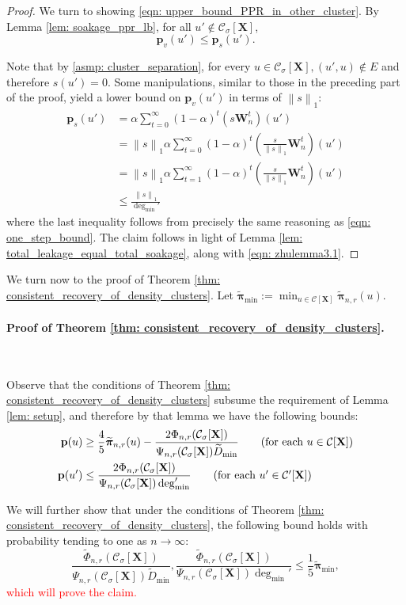 \documentclass{article}
\newcommand{\norm}[1]{\left\lVert#1\right\rVert}
\newcommand{\1}{\mathbf{1}}
\newcommand{\degminpr}{\deg_{\min}'}
\newcommand{\piminwt}{\widetilde{\pibf}_{\min}}
\newcommand{\pbf}{\mathbf{p}}
\newcommand{\pibf}{\bm{\pi}}
\newcommand{\Xbf}{\mathbf{X}}
\newcommand{\Wbf}{\mathbf{W}}
\newcommand{\Cset}{\mathcal{C}}
\newcommand{\Csig}{\Cset_{\sigma}}
\theoremstyle{aldenthm}
\begin{document}
\begin{proof}
	We turn to showing \eqref{eqn: upper_bound_PPR_in_other_cluster}. By Lemma \ref{lem: soakage_ppr_lb}, for all $u' \not\in \Csig[\Xbf]$,
	\begin{equation*}
	\pbf_v(u') \leq \pbf_s(u').
	\end{equation*}
	
	Note that by \ref{asmp: cluster_separation}, for every $u \in \Csig[\Xbf], (u',u) \not\in E$ and therefore $s(u') = 0$. Some manipulations, similar to those in the preceding part of the proof, yield a lower bound on $\pbf_v(u')$ in terms of $\norm{s}_1$:
	\begin{align*}
	\pbf_s(u') & = \alpha \sum_{t = 0}^{\infty} (1 - \alpha)^t \left(s \Wbf_n^t\right)(u') \\
	& = \norm{s}_1 \alpha \sum_{t = 0}^{\infty} (1 - \alpha)^t \left(\frac{s}{\norm{s}_1} \Wbf_n^t\right)(u') \\
	& = \norm{s}_1 \alpha \sum_{t = 1}^{\infty} (1 - \alpha)^t \left(\frac{s}{\norm{s}_1} \Wbf_n^t\right)(u') \\
	& \leq \frac{\norm{s}_1}{\degminpr}
	\end{align*}
	where the last inequality follows from precisely the same reasoning as \eqref{eqn: one_step_bound}. The claim follows in light of Lemma \ref{lem: total_leakage_equal_total_soakage}, along with \eqref{eqn: zhulemma3.1}.
\end{proof}


We turn now to the proof of Theorem \ref{thm: consistent_recovery_of_density_clusters}. Let $\piminwt := \min_{u \in \Cset[\Xbf]} \widetilde{\pibf}_{n,r}(u)$.
\paragraph{Proof of Theorem \ref{thm: consistent_recovery_of_density_clusters}.}
~

Observe that the conditions of Theorem \ref{thm: consistent_recovery_of_density_clusters} subsume the requirement of Lemma \ref{lem: setup}, and therefore by that lemma we have the following bounds:
\begin{align*}
\pbf(u) & \geq \frac{4}{5} \widetilde{\pibf}_{n,r}(u) - \frac{2 \Phi_{n,r}(\Csig[\Xbf])}{\Psi_{n,r}(\Csig[\Xbf]) \widetilde{D}_{\min}} \tag{for each $u \in \Cset[\Xbf]$} \\
\pbf(u') & \leq \frac{2 \Phi_{n,r}(\Csig[\Xbf])}{\Psi_{n,r}(\Csig[\Xbf]) \degminpr} \tag{for each $u' \in \Cset'[\Xbf]$}
\end{align*}

We will further show that under the conditions of Theorem \ref{thm: consistent_recovery_of_density_clusters}, the following bound holds with probability tending to one as $n \to \infty$:
\begin{equation}
\label{eqn: gap_bounds}
\frac{\widetilde{\Phi}_{n,r}(\Csig[\Xbf])}{\Psi_{n,r}(\Csig[\Xbf]) \widetilde{D}_{\min}}, \frac{\widetilde{\Phi}_{n,r}(\Csig[\Xbf])}{\Psi_{n,r}(\Csig[\Xbf]) \degminpr} \leq \frac{1}{5} \piminwt,
\end{equation}
\textcolor{red}{which will prove the claim.}
\end{document}

